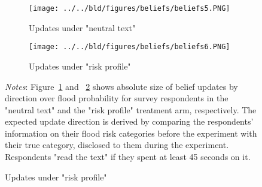 \clearpage

\begin{figure}
     \centering
     \caption{Belief updating over flood probability, by direction}
     \begin{subfigure}[b]{\linewidth}
         \centering
        \caption{Updates under "neutral text"}
         \texttt{[image: ../../bld/figures/beliefs/beliefs5.PNG]}
         \label{fig:updates-t1}
     \end{subfigure}
     \hfill
     \begin{subfigure}[b]{\linewidth}
         \centering
         \caption{Updates under "risk profile"}
         \texttt{[image: ../../bld/figures/beliefs/beliefs6.PNG]}
         \label{fig:updates-t2}
     \end{subfigure}
    \label{fig:updates}
\justifying
\footnotesize \textit{Notes}: Figure~\ref{fig:updates-t1} and ~\ref{fig:updates-t2} shows absolute size of belief updates by direction over flood probability for survey respondents in the "neutral text" and the "risk profile" treatment arm, respectively. The expected update direction is derived by comparing the respondents' information on their flood risk categories before the experiment with their true category, disclosed to them during the experiment. Respondents "read the text" if they spent at least 45 seconds on it.
\end{figure}

\clearpage